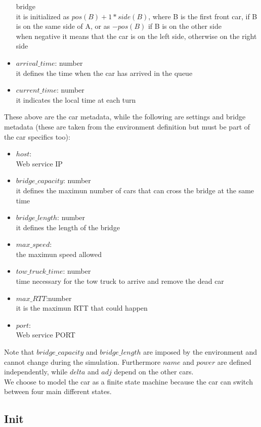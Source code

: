 \begin{itemize}
    bridge\\it is initialized as $pos(B)+1*side(B)$, where B is the first front car, if B is on the same side of A, or
    as $-pos(B)$ if B is on the other side\\ when negative it means that the car is on the left side, otherwise on the right side
    \item $arrival\_time$: number\\ it defines the time when the car has arrived in the queue
    \item $current\_time$: number\\ it indicates the local time at each turn
\end{itemize}
These above are the car metadata, while the following are settings and bridge metadata 
(these are taken from the environment definition but must be part of the car specifics too):
\begin{itemize}
    \item $host$:\\ Web service IP
    \item $bridge\_capacity$: number\\ it defines the maximun number of cars that can cross the bridge
    at the same time
    \item $bridge\_length$: number\\ it defines the length of the bridge
    \item $max\_speed$:\\ the maximun speed allowed
    \item $tow\_truck\_time$: number\\ time necessary for the tow truck to arrive and remove the dead car
    \item $max\_RTT$:number\\ it is the maximun RTT that could happen
    \item $port$:\\ Web service PORT
\end{itemize}

Note that $bridge\_capacity$ and $bridge\_length$ are imposed by the environment and cannot change during the
simulation. Furthermore $name$ and $power$ are defined independently, while $delta$ and $adj$ 
depend on the other cars.\\

We choose to model the car as a finite state machine because the car can switch between four main different states. 
\subsection{Init}

